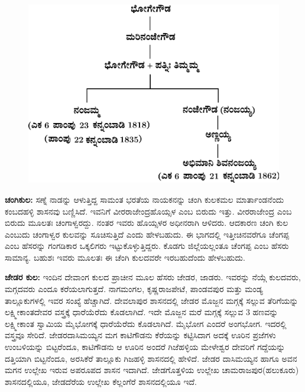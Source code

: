 \begin{figure}[!h]
\includegraphics[scale=.9]{images/chap5/chap5fig2.jpeg}
\end{figure}

\textbf{ಚಂಗಿಕುಲ:} ಸಣ್ನೆ ನಾಡನ್ನು ಆಳುತ್ತಿದ್ದ ಸಾಮಂತ ಭರತೆಯ ನಾಯಕನನ್ನು ಚಂಗಿ ಕುಲಕಮಲ ಮಾರ್ತಾಂಡನೆಂದು ಕಂಬದಹಳ್ಳಿ ಶಾಸನವು ಬಣ್ಣಿಸಿದೆ. ಇವನಿಗೆ ವೀರರಾಜೇಂದ್ರಹೊಯ್ಸಳ ಎಂಬ ಬಿರುದು ಇತ್ತು. ವೀರರಾಜೇಂದ್ರ ಎಂಬ ಬಿರುದು ಮೂಲತಃ ಚಂಗಾಳ್ವರದ್ದು. ನಂತರ ಇವರು ಹೊಯ್ಸಳರ ಅಧೀನರಾಗಿ ಆಳಿದರು. ಆದಕಾರಣ ಚಂಗಿ ಕುಲ ಎಂಬುದು ಚಂಗಾಳ್ವರ ಕುಲವನ್ನು ಸೂಚಿಸುತ್ತಿದೆ ಎಂದು ಹೇಳಬಹುದು. ಈ ಭಾಗದಲ್ಲಿ ಇತ್ತೀಚಿನವರೆಗೂ ಚೆಂಗಪ್ಪ ಎಂಬ ಹೆಸರನ್ನು ಗಂಗಡಿಕಾರ ಒಕ್ಕಲಿಗರು ಇಟ್ಟುಕೊಳ್ಳುತ್ತಿದ್ದರು. ಕೊಡಗು ಜಿಲ್ಲೆಯಲ್ಲಂತೂ ಚೆಂಗಪ್ಪ ಎಂಬ ಹೆಸರು ಸಾಮಾನ್ಯ. ಬಹುಶಃ ಇವರು ಮೂಲತಃ ಈ ಚೆಂಗಿ ಕುಲದವರೇ ಇರಬಹುದೆಂದು ಹೇಳಬಹುದು.

\textbf{ಜೇಡರ ಕುಲ:} ಇಂದಿನ ದೇವಾಂಗ ಕುಲದ ಪ್ರಾಚೀನ ಮೂಲ ಹೆಸರು ಜೇಡರ, ಜಾಡರು. ಇವರನ್ನು ನೆಯ್ಗೆ ಕುಲದವರು, ಮಗ್ಗದವರು ಎಂದೂ ಕರೆಯಲಾಗುತ್ತದೆ. ನಾಗಮಂಗಲ, ಕೃಷ್ಣರಾಜಪೇಟೆ, ಪಾಂಡವಪುರ ಮತ್ತು ಮಂಡ್ಯ ತಾಲ್ಲೂಕುಗಳಲ್ಲಿ ಇವರ ಸಂಖ್ಯೆ ಹೆಚ್ಚಾಗಿದೆ. ದೇವಲಾಪುರ ಶಾಸನದಲ್ಲಿ ಜೇಡರ ಮೊಜ್ಜನ ಮಗ್ಗಕ್ಕೆ ಸಲ್ಲುವ ತೆರಿಗೆಯನ್ನು ಲಕ್ಷ್ಮೀಕಾಂತದೇವರ ವಸ್ತ್ರಕ್ಕೆ ಧಾರೆಯೆರೆದು ಕೊಡಲಾಗಿದೆ. ಇದೇ ಮೊಜ್ಜನ ಮರೆ ಮಗ್ಗಕ್ಕೆ ಸಲ್ಲುವ 3 ಹಣವನ್ನು ಲಕ್ಷ್ಮೀಕಾಂತ ಸ್ವಾಮಿಯ ಮೈಭೋಗಕ್ಕೆ ಧಾರೆಯೆರೆದು ಕೊಡಲಾಗಿದೆ. ಮೈಭೋಗ ಎಂದರೆ ಅಂಗಭೋಗ. ಇದರಲ್ಲಿ ವಸ್ತ್ರವೂ ಸೇರಿದೆ. ಜೇಡರದಾಸಿಮಯ್ಯನ ಮಗ ಕಾಟಿಗೌಡನು ಕೆರೆಯನ್ನು ಕಟ್ಟಿಸಿದಾಗ ಅದಕ್ಕೆ ಊರಿನ ಪ್ರಜೆಗಳು ಉಂಬಳಿಯನ್ನು ಬಿಟ್ಟರೆಂದೂ, ಕಾಟಿಗೌಡನು ಆ ಊರಿನ ಅಂದರೆ ಗಿಜೆಹಳ್ಳಿಯ ಮೇಳೇಶ್ವರ ದೇವರಿಗೆ ಗದ್ದೆಯನ್ನು ದತ್ತಿಯಾಗಿ ಬಿಟ್ಟನೆಂದೂ, ಅರಸಿಕೆರೆ ತಾಲ್ಲೂಕು ಗಿಜಹಳ್ಳಿ ಶಾಸನದಲ್ಲಿ ಹೇಳಿದೆ. ಜೇಡರ ದಾಸಿಮಯ್ಯನ ಹಾಗೂ ಅವನ ಮಗನ ಉಲ್ಲೇಖ ಇರುವ ಅಪರೂಪದ ಶಾಸನ ಇದಾಗಿದೆ. ಜೇಡಗೊತ್ತಳಿಯ ಉಲ್ಲೇಖ ಚಾಮರಾಜಪುರ(ಹಲುಕೂರು) ಶಾಸನದಲ್ಲಿಯೂ, ಜೇಡದೆರೆಯ ಉಲ್ಲೇಖ ಕೆಲ್ಲಂಗೆರೆ ಶಾಸನದಲ್ಲಿಯೂ ಇದೆ.

